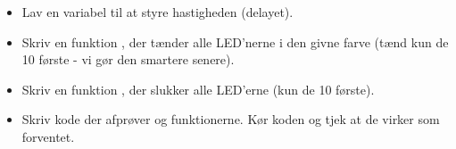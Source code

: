 \documentclass{ucph-handout}
\begin{document}
\begin{exercisebox}[adjusted title=Gør koden pænere: Variable og Funktioner]
\begin{itemize}
\item Lav en variabel til at styre hastigheden (delayet).
\item Skriv en funktion , der tænder alle LED'nerne i
  den givne farve (tænd kun de 10 første - vi gør den smartere senere).
\item Skriv en funktion , der slukker alle LED'erne (kun de 10 første).
\item Skriv kode der afprøver  og 
  funktionerne. Kør koden og tjek at de virker som forventet.
\end{itemize}
\end{exercisebox}



\end{document}

